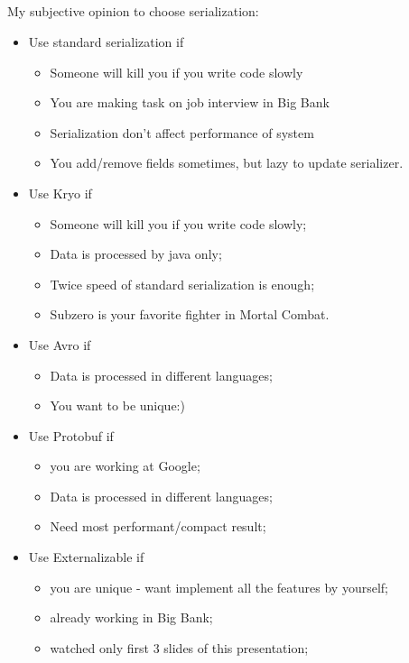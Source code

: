 \documentclass[8pt]{beamer}
\begin{document}
\subsection{\partname}
\begin{frame}[fragile]{\partname}

My subjective opinion to choose serialization:
\begin{itemize}
  \item<1-> Use standard serialization if {
    \begin{itemize}
      \item<1-> Someone will kill you if you write code slowly
      \item<2-> You are making task on job interview in Big Bank
      \item<3-> Serialization don't affect performance of system
      \item<4-> You add/remove fields sometimes, but lazy to update serializer.
    \end{itemize}
  }
  \item<5-> Use Kryo if {
    \begin{itemize}
      \item<6-> Someone will kill you if you write code slowly;
      \item<7-> Data is processed by java only;
      \item<8-> Twice speed of standard serialization is enough;
      \item<9-> Subzero is your favorite fighter in Mortal Combat.
    \end{itemize}
  }


  \item<10-> Use Avro if {
    \begin{itemize}
      \item<11-> Data is processed in different languages;
      \item<12-> You want to be unique:)
    \end{itemize}
  }

  \item<13-> Use Protobuf if {
    \begin{itemize}
      \item<14-> you are working at Google;
      \item<15-> Data is processed in different languages;
      \item<16-> Need most performant/compact result;
    \end{itemize}
  }

  \item<17-> Use Externalizable if {
    \begin{itemize}
      \item<18-> you are unique - want implement all the features by yourself;
      \item<19-> already working in Big Bank;
      \item<20-> watched only first 3 slides of this presentation;
    \end{itemize}
  }


\end{itemize}
\end{frame}
\end{document}
